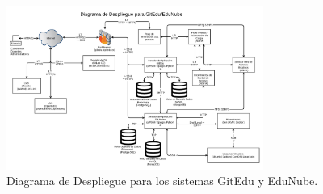 \begin{figure}
  \begin{center}
    \includegraphics[width=0.75\textwidth]{Figures/desp_ge_en.png}
  \end{center}
  \caption{Diagrama de Despliegue para los sistemas GitEdu y EduNube.}
  \label{desp_ge_en}
\end{figure}

